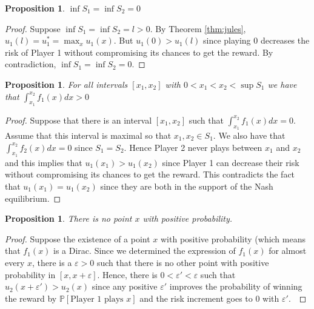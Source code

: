 \documentclass[preprint,12pt,authoryear]{elsarticle}
\newtheorem{proposition}[theorem]{Proposition}
\theoremstyle{definition}
\begin{document}
\begin{proposition}
    $\inf S_1 = \inf S_2 = 0$
\end{proposition}
\begin{proof}
Suppose $\inf S_1 = \inf S_2 = l > 0$. By Theorem \ref{thm:jules}, $u_1(l) = u_1^* = \max_x u_1(x)$. But $u_1(0) > u_1(l)$ since playing $0$ decreases the risk of Player 1 without compromising its chances to get the reward. By contradiction, $\inf S_1 = \inf S_2 = 0$.
 \end{proof}
\begin{proposition}
For all intervals $[x_1, x_2]$ with $0 < x_1 < x_2 < \sup S_1$ we have that $\int_{x_1}^{x_2} f_1(x) dx > 0$
 \end{proposition}
\begin{proof}
    
 Suppose that there is an interval $[x_1, x_2]$ such that $\int_{x_1}^{x_2} f_1(x) dx =0$. Assume that this interval is maximal so that $x_1, x_2 \in S_1$. We also have that $\int_{x_1}^{x_2} f_2(x) dx = 0$ since $S_1 = S_2$. Hence Player 2 never plays between $x_1$ and $x_2$ and this implies that $u_1(x_1) > u_1(x_2)$ since Player 1 can decrease their risk without compromising its chances to get the reward. This contradicts the fact that $u_1(x_1) = u_1(x_2)$ since they are both in the support of the Nash equilibrium.
\end{proof}
\begin{proposition}
There is no point $x$ with positive probability.
\end{proposition}
\begin{proof}
 Suppose the existence of a point $x$ with positive probability (which means that $f_1(x)$ is a Dirac. Since we determined the expression of $f_1(x)$ for almost every $x$, there is a $\varepsilon > 0$ such that there is no other point with positive probability in $[x, x+\varepsilon]$. Hence, there is $0 < \varepsilon' < \varepsilon$ such that $u_2(x + \varepsilon') > u_2(x)$ since any positive $\varepsilon'$ improves the probability of winning the reward by $\mathbb{P}[\text{Player 1 plays } x]$ and the risk increment goes to $0$ with $\varepsilon'$.\
\end{proof}

\nashcor*
\end{document}
